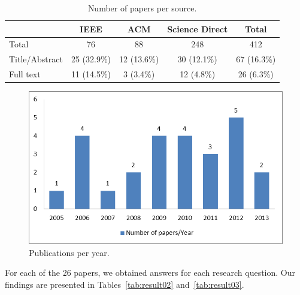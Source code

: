 \documentclass{sig-alternate}
\begin{document}
\begin{table}[ht!]
\tiny
\centering
\begin{tabular}{l|c|c|c|c}
  \hline
  \hline
   & IEEE & ACM  & Science Direct & Total \\
  \hline
  \hline
  Total  & 76 &  88  & 248 & 412 \\
  \hline
  Title/Abstract & 25 (32.9\%) & 12 (13.6\%) & 30 (12.1\%)  & 67 (16.3\%) \\
  \hline
  Full text & 11 (14.5\%) & 3 (3.4\%) & 12 (4.8\%) & 26 (6.3\%)\\
  \hline
  \hline
\end{tabular}
\caption{Number of papers per source.}
\label{tab:result01}
\end{table}


\begin{figure} 
\centering
\includegraphics[width=.49\textwidth]{figs/NumberPapersYear.png}
\caption{Publications per year.}
\label{fig:statistics}
\end{figure}

For each of the 26 papers, we obtained answers for each research question.
Our findings are presented in Tables~\ref{tab:result02} and~\ref{tab:result03}.
\end{document}
